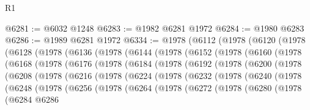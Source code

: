 \begin{lexlean}{R1}
\begin{coremodule}
@6281 := @6032 @1248
@6283 := @1982 @6281 @1972
@6284 := @1980 @6283
@6286 := @1989 @6281 @1972
@6334 := @1978
    (@6112
      (@1978
        (@6120
          (@1978
            (@6128
              (@1978
                (@6136
                  (@1978
                    (@6144
                      (@1978
                        (@6152
                          (@1978
                            (@6160
                              (@1978
                                (@6168
                                  (@1978
                                    (@6176
                                      (@1978
                                        (@6184
                                          (@1978
                                            (@6192
                                              (@1978
                                                (@6200
                                                  (@1978
                                                    (@6208
                                                      (@1978
                                                        (@6216
                                                          (@1978
                                                            (@6224
                                                              (@1978
                                                                (@6232
                                                                  (@1978
                                                                    (@6240
                                                                      (@1978
                                                                        (@6248
                                                                          (@1978
                                                                            (@6256
                                                                              (@1978
                                                                                (@6264
                                                                                  (@1978
                                                                                    (@6272
                                                                                      (@1978
                                                                                        (@6280
                                                                                          (@1978
                                                                                            (@6284
                                                                                              @6286

\end{coremodule}
\end{lexlean}
